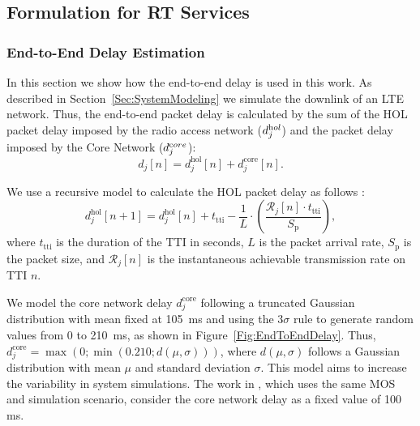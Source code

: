 \documentclass[conference]{IEEEtran}
\newcommand{\FigRef}[1]{Figure~\ref{#1}}
\newcommand{\SecRef}[1]{Section~\ref{#1}}
\newcommand{\AppRef}[1]{Appendix~\ref{#1}}
\begin{document}
%

\subsection{Formulation for RT Services}
\label{Sec:FormRT}

\subsubsection{End-to-End Delay Estimation}
In this section we show how the end-to-end delay is used in this work. As described in \SecRef{Sec:SystemModeling}
we simulate the downlink of an LTE network. Thus, the end-to-end packet delay is calculated by the sum of the \ac{HOL} packet delay imposed by the radio access network ($d_j ^{\text hol}$) and the packet delay imposed by the Core Network ($d_j^{\text core}$):
%
\begin{equation}
\label{Eq:endToEndDelay}
d_j[n] = d_{j}^\text{hol}[n] + d_j^\text{core}[n].
\end{equation}

We use a recursive model to calculate the \ac{HOL} packet delay as follows \cite{Rodrigues2014_Wiley}:
%
\begin{equation}
\label{Eq:HOL_Delay}
d_{j}^\mathrm{hol}\left[n+1\right] = d_{j}^\mathrm{hol}\left[n\right] + t_{\text{tti}} - \frac{1}{L} \cdot \left( \frac{\mathcal{R}_{j}[n] \cdot t_{\text{tti}}}{S_\mathrm{p}}\right),
\end{equation}
%
where $t_{\text{tti}}$ is the duration of the \ac{TTI} in seconds, $L$ is the packet arrival rate, $S_\mathrm{p}$ is the packet size, and $\mathcal{R}_{j}[n]$ is the instantaneous achievable transmission rate on \ac{TTI} $n$.

We model the core network delay $d_j^\text{core}$ following a truncated Gaussian distribution with mean fixed at \SI{105}{\ms} and using the $3\sigma$ rule to generate random values from 0 to \SI{210}{\ms}, as shown in \FigRef{Fig:EndToEndDelay}. %
Thus, $d_j^\text{core} = \max(0; \min(0.210; d(\mu, \sigma)))$, where $ d(\mu, \sigma) $ follows a Gaussian distribution with mean $ \mu $ and standard deviation $ \sigma $. %
This model aims to increase the variability in system simulations. The work in \cite{liu2012novel}, which uses the same MOS and simulation scenario, consider the core network delay as a fixed value of 100 ms. 
\end{document}
